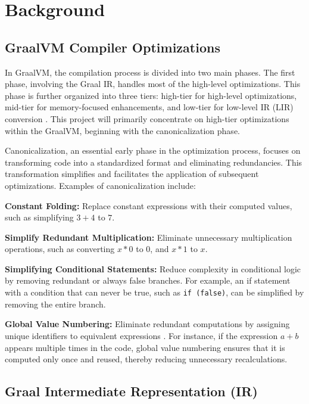 \chapter[Background]{Background}
\section{GraalVM Compiler Optimizations}

In GraalVM, the compilation process is divided into two main phases. The first phase, involving the Graal IR, handles most of the high-level optimizations. This phase is further organized into three tiers: high-tier for high-level optimizations, mid-tier for memory-focused enhancements, and low-tier for low-level IR (LIR) conversion \cite{Graal2021}. This project will primarily concentrate on high-tier optimizations within the GraalVM, beginning with the canonicalization phase.

Canonicalization, an essential early phase in the optimization process, focuses on transforming code into a standardized format and eliminating redundancies. This transformation simplifies and facilitates the application of subsequent optimizations. Examples of canonicalization include:

\begin{description}
    \item \textbf{Constant Folding:} Replace constant expressions with their computed values, such as simplifying \newline
    \(3 + 4\) to \(7\).
    \item \textbf{Simplify Redundant Multiplication:} Eliminate unnecessary multiplication operations, such as converting \(x * 0\) to 0, and \(x * 1\) to \(x\).
    \item \textbf{Simplifying Conditional Statements:} Reduce complexity in conditional logic by removing redundant or always false branches. For example, an if statement with a condition that can never be true, such as \texttt{if (false)}, can be simplified by removing the entire branch.
    \item \textbf{Global Value Numbering:} Eliminate redundant computations by assigning unique identifiers to equivalent expressions \cite{Cliff1995}. For instance, if the expression \(a + b\) appears multiple times in the code, global value numbering ensures that it is computed only once and reused, thereby reducing unnecessary recalculations.
\end{description}

\section{Graal Intermediate Representation (IR)}

